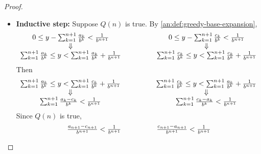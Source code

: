 \begin{proof}
\begin{itemize}
\[          \]
          Therefore,
          \[
            \begin{array}{c}
              a_{1} = c_{1} \\
              \Downarrow    \\
              Q(1) \text{ is true}
            \end{array}
          \]
    \item \textbf{Inductive step:} Suppose $Q(n)$ is true. By \cref{an:def:greedy-base-expansion},
          \[
            \begin{array}{c@{\qquad\quad\qquad}c}
              0 \leq y - \sum_{k = 1}^{n + 1} \frac{a_{k}}{b^{k}} < \frac{1}{b^{n + 1}} &
              0 \leq y - \sum_{k = 1}^{n + 1} \frac{c_{k}}{b^{k}} < \frac{1}{b^{n + 1}}              \\
              \Downarrow                                                                & \Downarrow \\
              \sum_{k = 1}^{n + 1} \frac{a_{k}}{b^{k}} \leq y <
              \sum_{k = 1}^{n + 1} \frac{a_{k}}{b^{k}} + \frac{1}{b^{n + 1}}            &
              \sum_{k = 1}^{n + 1} \frac{c_{k}}{b^{k}} \leq y <
              \sum_{k = 1}^{n + 1} \frac{c_{k}}{b^{k}} + \frac{1}{b^{n + 1}}
            \end{array}
          \]
          Then
          \[
            \begin{array}{c@{\qquad\quad\qquad}c}
              \sum_{k = 1}^{n + 1} \frac{a_{k}}{b^{k}} \leq y <
              \sum_{k = 1}^{n + 1} \frac{c_{k}}{b^{k}} + \frac{1}{b^{n + 1}}         &
              \sum_{k = 1}^{n + 1} \frac{c_{k}}{b^{k}} \leq y <
              \sum_{k = 1}^{n + 1} \frac{a_{k}}{b^{k}} + \frac{1}{b^{n + 1}}                      \\
              \Downarrow                                                             & \Downarrow \\
              \sum_{k = 1}^{n + 1} \frac{a_{k} - c_{k}}{b^{k}} < \frac{1}{b^{n + 1}} &
              \sum_{k = 1}^{n + 1} \frac{c_{k} - a_{k}}{b^{k}} < \frac{1}{b^{n + 1}}              \\
            \end{array}
          \]
          Since $Q(n)$ is true,
          \[
            \begin{array}{c@{\qquad\quad\qquad}c}
              \frac{a_{n + 1} - c_{n + 1}}{b^{n + 1}} < \frac{1}{b^{n + 1}} &
              \frac{c_{n + 1} - a_{n + 1}}{b^{n + 1}} < \frac{1}{b^{n + 1}}              \\

\end{array}\]
\end{itemize}
\end{proof}
